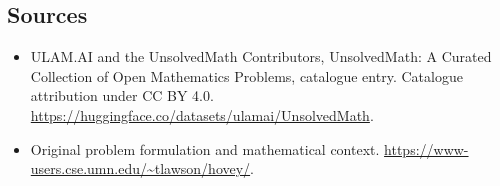 \documentclass[11pt]{article}
\begin{document}
\subsection{Sources}
\begin{itemize}
\item[\hypertarget{source:statement:1}{S1}] ULAM.AI and the UnsolvedMath Contributors, UnsolvedMath: A Curated Collection of Open Mathematics Problems, catalogue entry. Catalogue attribution under CC BY 4.0.
\url{https://huggingface.co/datasets/ulamai/UnsolvedMath}.
\item[\hypertarget{source:statement:2}{S2}] Original problem formulation and mathematical context.
\url{https://www-users.cse.umn.edu/~tlawson/hovey/}.
\end{itemize}
\label{end:statement}
\end{document}

